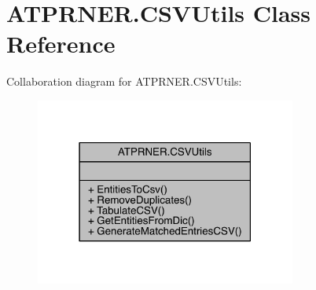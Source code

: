 \hypertarget{class_a_t_p_r_n_e_r_1_1_c_s_v_utils}{}\section{A\+T\+P\+R\+N\+E\+R.\+C\+S\+V\+Utils Class Reference}
\label{class_a_t_p_r_n_e_r_1_1_c_s_v_utils}


Collaboration diagram for A\+T\+P\+R\+N\+E\+R.\+C\+S\+V\+Utils\+:
\nopagebreak
\begin{figure}[H]
\begin{center}
\leavevmode
\includegraphics[width=243pt]{d5/d53/class_a_t_p_r_n_e_r_1_1_c_s_v_utils__coll__graph}
\end{center}
\end{figure}
